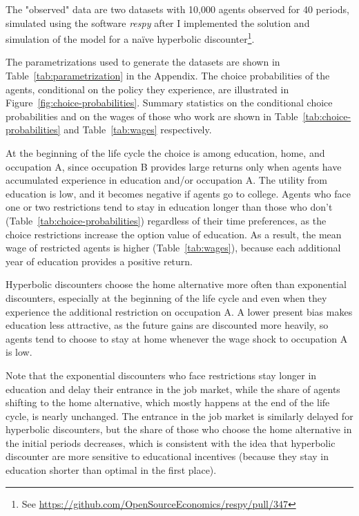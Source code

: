 The "observed" data are two datasets with 10,000 agents observed for 40 periods, simulated using the software \textit{respy} after I implemented the solution and simulation of the model for a naïve hyperbolic discounter\footnote{See \url{https://github.com/OpenSourceEconomics/respy/pull/347}}.

The parametrizations used to generate the datasets are shown in Table~\ref{tab:parametrization} in the Appendix. The choice probabilities of the agents, conditional on the policy they experience, are illustrated in Figure~\ref{fig:choice-probabilities}. Summary statistics on the conditional choice probabilities and on the wages of those who work are shown in Table~\ref{tab:choice-probabilities} and Table~\ref{tab:wages} respectively.

At the beginning of the life cycle the choice is among education, home, and occupation A, since occupation B provides large returns only when agents have accumulated experience in education and/or occupation A. The utility from education is low, and it becomes negative if agents go to college. Agents who face one or two restrictions tend to stay in education longer than those who don't (Table~\ref{tab:choice-probabilities}) regardless of their time preferences, as the choice restrictions increase the option value of education. As a result, the mean wage of restricted agents is higher (Table~\ref{tab:wages}), because each additional year of education provides a positive return. 

Hyperbolic discounters choose the home alternative more often than exponential discounters, especially at the beginning of the life cycle and even when they experience the additional restriction on occupation A. A lower present bias makes education less attractive, as the future gains are discounted more heavily, so agents tend to choose to stay at home whenever the wage shock to occupation A is low. 

Note that the exponential discounters who face restrictions stay longer in education and delay their entrance in the job market, while the share of agents shifting to the home alternative, which mostly happens at the end of the life cycle, is nearly unchanged. The entrance in the job market is similarly delayed for hyperbolic discounters, but the share of those who choose the home alternative in the initial periods decreases, which is consistent with the idea that hyperbolic discounter are more sensitive to educational incentives (because they stay in education shorter than optimal in the first place).

